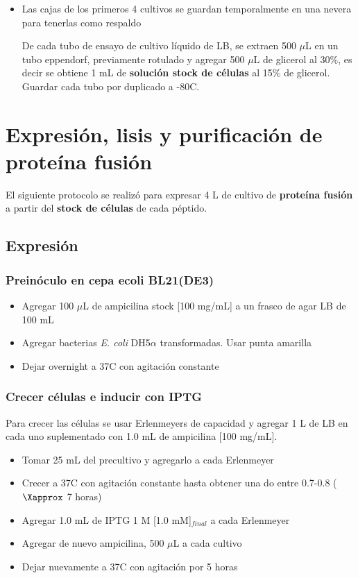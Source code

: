 \begin{appendix}
\begin{itemize}
    \item{Las cajas de los primeros 4 cultivos se guardan temporalmente en una nevera para tenerlas como respaldo}
    
   
    De cada tubo de ensayo de cultivo líquido de LB, se extraen 500 $\mu$L en un tubo eppendorf, previamente rotulado y agregar 500 $\mu$L de glicerol al 30\%, es decir se obtiene 1 mL de \textbf{solución stock de células} al 15\% de glicerol. Guardar cada tubo por duplicado a -80\textdegree C.

\end{itemize}


\section{Expresión, lisis y purificación de proteína fusión}\label{Protocolo_Fusion}

El siguiente protocolo se realizó para expresar 4 L de cultivo de \textbf{proteína fusión} a partir del \textbf{stock de células} de cada péptido.

\subsection{Expresión}

\subsubsection{Preinóculo en cepa \ac{ecoli} BL21(DE3)}
    \begin{itemize}
        \item{Agregar 100 $\mu$L de ampicilina stock [100 mg/mL] a un frasco de agar LB de 100 mL}
        \item{Agregar bacterias \emph{E. coli} DH5$\alpha$ transformadas. Usar punta amarilla}
        \item{Dejar overnight a 37\textdegree C con agitación constante}
\end{itemize}

\subsubsection{Crecer células e inducir con IPTG}

Para crecer las células se usar Erlenmeyers de capacidad y agregar 1 L de LB en cada uno suplementado con 1.0 mL de ampicilina [100 mg/mL].
    \begin{itemize}
        \item{Tomar 25 mL del precultivo y agregarlo a cada Erlenmeyer}
        \item{Crecer a 37\textdegree C con agitación constante hasta obtener una \ac{do} entre 0.7-0.8 ($\Xapprox$ 7 horas)}
        \item{Agregar 1.0 mL de IPTG 1 M [1.0 mM]$_{final}$ a cada Erlenmeyer}
        \item{Agregar de nuevo ampicilina, 500 $\mu$L a cada cultivo}
        \item{Dejar nuevamente a 37\textdegree C con agitación por 5 horas}
    \end{itemize}


\end{appendix}
